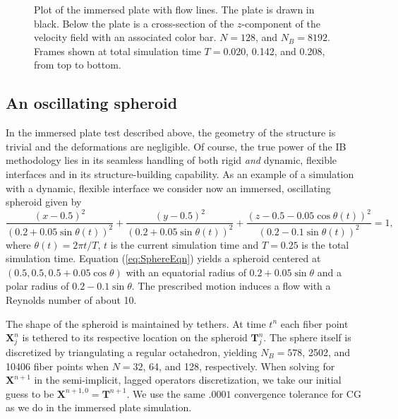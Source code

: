 \documentclass[preprint,12pt]{elsarticle}
\newcommand{\B}[1]{\mathbf{#1}}
\newcommand{\New}[1]{{\color{Red}#1}}
\begin{document}
\begin{figure}[htb]
\begin{center}
	\end{center}
	\caption{\small Plot of the immersed plate with flow lines. The plate is drawn in black. Below the plate is a cross-section of the $z$-component of the velocity field with an associated color bar. $N=128$, and $N_B=8192$. Frames shown at total simulation time $T=0.020$, 0.142, and 0.208, from top to bottom.}
\label{fig:TimeProgression_Plate}
\end{figure}


\subsection{An oscillating spheroid}

In the immersed plate test described above, the geometry of the structure is trivial and the deformations are negligible. 
Of course, the true power of the IB methodology lies in its seamless handling of both rigid {\em and} dynamic, flexible interfaces and in its structure-building capability. As an example of a simulation with a dynamic, flexible  interface we consider now an immersed, oscillating spheroid
given by
\begin{equation}
\frac{(x-0.5)^2}{(0.2+0.05\sin\theta(t))^2} +
\frac{(y-0.5)^2}{(0.2+0.05\sin\theta(t))^2} +
\frac{(z-0.5-0.05\cos\theta(t))^2}{(0.2-0.1\sin\theta(t))^2} = 1,
\label{eq:SphereEqn}
\end{equation}
where $\theta(t) = 2\pi t/T$, $t$ is the current simulation time and $T=0.25$ is the total simulation time. Equation (\ref{eq:SphereEqn}) yields a spheroid centered at $(0.5,0.5,0.5+0.05\cos\theta)$ with an equatorial radius of $0.2+0.05\sin\theta$ and a polar radius of $0.2-0.1\sin\theta$.
The prescribed motion induces a flow with a Reynolds number of about 10.

The shape of the spheroid is maintained by tethers. At time $t^n$ each fiber point $\B{X}^n_j$ is tethered to its respective location on the spheroid $\B{T}^n_j$. The sphere itself is discretized by triangulating a regular octahedron, yielding $N_B=578$, 2502, and 10406 fiber points when $N=32$, 64, and 128,  respectively. When solving for $\B{X}^{n+1}$ in the semi-implicit, lagged operators discretization, we take our initial guess to be $\B{X}^{n+1,0}=\B{T}^{n+1}$.
\New{We use the same $.0001$ convergence tolerance for CG as we do in the immersed plate simulation.}
\end{document}
